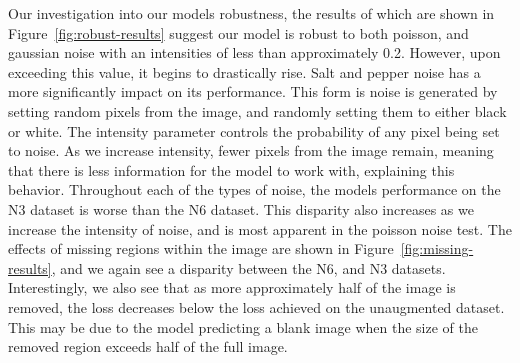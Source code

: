 \documentclass[twocolumn]{article}
\begin{document}
Our investigation into our models robustness, the results of which are shown in Figure~\ref{fig:robust-results} suggest our model is robust to both poisson, and gaussian noise with an intensities of less than approximately 0.2. However, upon exceeding this value, it begins to drastically rise. Salt and pepper noise has a more significantly impact on its performance. This form is noise is generated by setting random pixels from the image, and randomly setting them to either black or white. The intensity parameter controls the probability of any pixel being set to noise. As we increase intensity, fewer pixels from the image remain, meaning that there is less information for the model to work with, explaining this behavior. Throughout each of the types of noise, the models performance on the N3 dataset is worse than the N6 dataset. This disparity also increases as we increase the intensity of noise, and is most apparent in the poisson noise test. The effects of missing regions within the image are shown in Figure~\ref{fig:missing-results}, and we again see a disparity between the N6, and N3 datasets. Interestingly, we also see that as more approximately half of the image is removed, the loss decreases below the loss achieved on the unaugmented dataset. This may be due to the model predicting a blank image when the size of the removed region exceeds half of the full image. 
\end{document}
